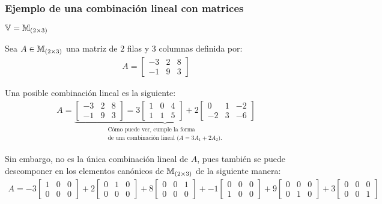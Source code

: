 \subsubsection{Ejemplo de una combinación lineal con matrices}
\label{sec:ejemplo_de_una_combinacion_lineal_con_matrices}

\begin{center}
    $\mathbb{V} = \mathbb{M}_{(2 \times 3)}$
\end{center}

Sea $A \in \mathbb{M}_{(2 \times 3)}$ una matriz de $2$ filas y $3$ columnas definida por:
\begin{align*}
    A = \begin{bmatrix}
        -3 & 2 & 8 \\
        -1 & 9 & 3
    \end{bmatrix}
\end{align*}

Una posible combinación lineal es la siguiente:
\begin{align*}
    A = \underbrace{\begin{bmatrix}
        -3 & 2 & 8 \\
        -1 & 9 & 3
    \end{bmatrix} = 3 \begin{bmatrix}
        1 & 0 & 4 \\
        1 & 1 & 5
    \end{bmatrix} + 2 \begin{bmatrix}
        0 & 1 & -2 \\
        -2 & 3 & -6
    \end{bmatrix}}_{\substack{\text{Cómo puede ver, cumple la forma} \\ \text{de una combinación lineal ($A = 3A_1 + 2A_2$).}}}
\end{align*}

Sin embargo, no es la única combinación lineal de $A$, pues también se puede descomponer en los elementos canónicos de $\mathbb{M}_{(2 \times 3)}$ de la siguiente manera:
\begin{align*}
    A = -3 \begin{bmatrix}
        1 & 0 & 0 \\
        0 & 0 & 0
    \end{bmatrix} + 2 \begin{bmatrix}
        0 & 1 & 0 \\
        0 & 0 & 0
    \end{bmatrix} + 8 \begin{bmatrix}
        0 & 0 & 1 \\
        0 & 0 & 0
    \end{bmatrix} + -1 \begin{bmatrix}
        0 & 0 & 0 \\
        1 & 0 & 0
    \end{bmatrix} + 9 \begin{bmatrix}
        0 & 0 & 0 \\
        0 & 1 & 0
    \end{bmatrix} + 3 \begin{bmatrix}
        0 & 0 & 0 \\
        0 & 0 & 1
    \end{bmatrix}
\end{align*}

